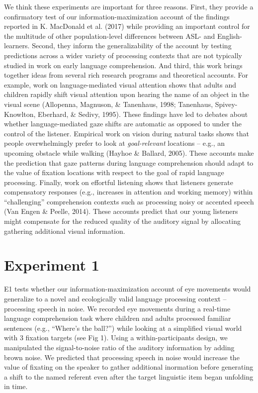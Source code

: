 \documentclass[10pt, letterpaper]{article}
\begin{document}
We think these experiments are important for three reasons. First, they
provide a confirmatory test of our information-maximization account of
the findings reported in K. MacDonald et al. (2017) while providing an
important control for the multitude of other population-level
differences between ASL- and English-learners. Second, they inform the
generalizability of the account by testing predictions across a wider
variety of processing contexts that are not typically studied in work on
early language comprehension. And third, this work brings together ideas
from several rich research programs and theoretical accounts. For
example, work on language-mediated visual attention shows that adults
and children rapidly shift visual attention upon hearing the name of an
object in the visual scene (Allopenna, Magnuson, \& Tanenhaus, 1998;
Tanenhaus, Spivey-Knowlton, Eberhard, \& Sedivy, 1995). These findings
have led to debates about whether language-mediated gaze shifts are
automatic as opposed to under the control of the listener. Empirical
work on vision during natural tasks shows that people overwhelmingly
prefer to look at \emph{goal-relevant} locations -- e.g., an upcoming
obstacle while walking (Hayhoe \& Ballard, 2005). These accounts make
the prediction that gaze patterns during language comprehension should
adapt to the value of fixation locations with respect to the goal of
rapid language processing. Finally, work on effortful listening shows
that listeners generate compensatory responses (e.g., increases in
attention and working memory) within ``challenging'' comprehension
contexts such as processing noisy or accented speech (Van Engen \&
Peelle, 2014). These accounts predict that our young listeners might
compensate for the reduced quality of the auditory signal by allocating
gathering additional visual information.

\section{Experiment 1}\label{experiment-1}

E1 tests whether our information-maximization account of eye movements
would generalize to a novel and ecologically valid language processing
context -- processing speech in noise. We recorded eye movements during
a real-time language comprehension task where children and adults
processed familiar sentences (e.g., ``Where's the ball?'') while looking
at a simplified visual world with 3 fixation targets (see Fig 1). Using
a within-participants design, we manipulated the signal-to-noise ratio
of the auditory information by adding brown noise. We predicted that
processing speech in noise would increase the value of fixating on the
speaker to gather additional inormation before generating a shift to the
named referent even after the target linguistic item began unfolding in
time.
\end{document}
